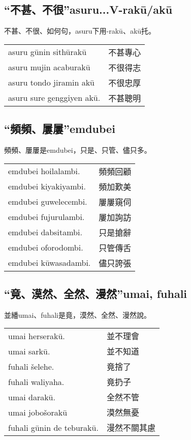 \documentclass{article}
\begin{document}
\subsection{“不甚、不很”asuru...V-rak\={u}/ak\={u}}
\noindent 不甚、不很、如何句，asuru下用-rak\={u}、ak\={u}托。
\begin{center}
    \begin{tabularx}{\textwidth}{XX}
        asuru g\={u}nin sith\={u}rak\={u} & 不甚專心\\
        asuru mujin acaburak\={u} & 不很得志\\
        asuru tondo jiramin ak\={u} & 不很忠厚\\
        asuru sure genggiyen ak\={u}. & 不甚聰明
    \end{tabularx}
\end{center}

\subsection{“頻頻、屢屢”emdubei}
\noindent 頻頻、屢屢是emdubei，只是、只管、儘只多。
\begin{center}
    \begin{tabularx}{\textwidth}{XX}
        emdubei hoilalambi. & 頻頻回顧\\
        emdubei kiyakiyambi. & 頻加歎美\\
        emdubei guwelecembi. & 屢屢窺伺\\
        emdubei fujurulambi. & 屢加詢訪\\
        emdubei dabsitambi. & 只是搶辭\\
        emdubei oforodombi. & 只管傳舌\\
        emdubei k\={u}wasadambi. & 儘只誇張
    \end{tabularx}
\end{center}

\subsection{“竟、漠然、全然、漫然”umai, fuhali}
\noindent 並繙umai、fuhali是竟，漠然、全然、漫然說。
\begin{center}
    \begin{tabularx}{\textwidth}{XX}
        umai herserak\={u}. & 並不理會\\
        umai sark\={u}. & 並不知道\\
        fuhali \v{s}elehe. &竟捨了\\
        fuhali waliyaha. & 竟扔子\\
        umai darak\={u}. & 全然不管\\
        umai jobo\v{s}orak\={u} & 漠然無憂\\
        fuhali g\={u}nin de teburak\={u}. & 漫然不關其慮
    \end{tabularx}
\end{center}
\end{document}

